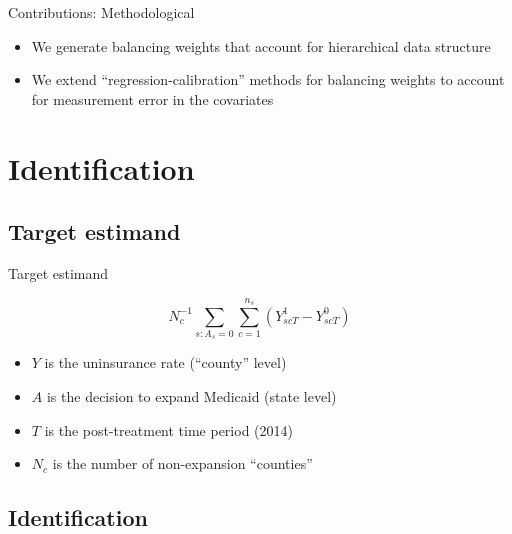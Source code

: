 \documentclass[hyperref={pdfpagelabels=false}]{beamer}
\begin{document}
\begin{frame}{Contributions: Methodological}
\begin{itemize}

    \item We generate balancing weights that account for hierarchical data structure \bigskip
    
    \item We extend ``regression-calibration'' methods for balancing weights to account for measurement error in the covariates \bigskip
    \end{itemize}
\end{frame}

\section{Identification}

\subsection{Target estimand}

\begin{frame}{Target estimand}

$$
N_c^{-1}\sum_{s: A_s = 0} \sum_{c = 1}^{n_s} (Y_{scT}^1 - Y_{scT}^0)
$$

\begin{itemize}
    \item $Y$ is the uninsurance rate (``county'' level) \bigskip
    \item $A$ is the decision to expand Medicaid (state level) \bigskip
    \item $T$ is the post-treatment time period (2014) \bigskip
    \item $N_c$ is the number of non-expansion ``counties''
\end{itemize}
\end{frame}

\subsection{Identification}
\end{document}
